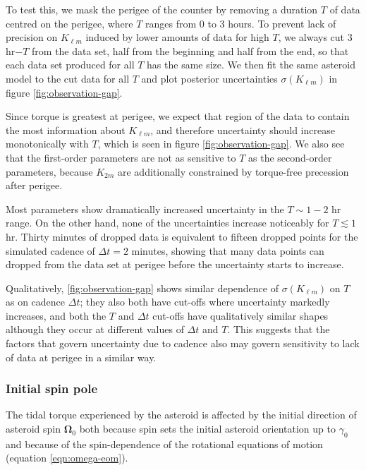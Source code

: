 \documentclass[fleqn,usenatbib]{mnras}
\begin{document}
To test this, we mask the perigee of the counter by removing a duration $T$ of data centred on the perigee, where $T$ ranges from 0 to 3 hours. To prevent lack of precision on $K_{\ell m}$ induced by lower amounts of data for high $T$, we always cut 3 hr$-T$ from the data set, half from the beginning and half from the end, so that each data set produced for all $T$ has the same size. We then fit the same asteroid model to the cut data for all $T$ and plot posterior uncertainties $\sigma(K_{\ell m})$ in figure \ref{fig:observation-gap}.

Since torque is greatest at perigee, we expect that region of the data to contain the most information about $K_{\ell m}$, and therefore uncertainty should increase monotonically with $T$, which is seen in figure \ref{fig:observation-gap}. We also see that the first-order parameters are not as sensitive to $T$ as the second-order parameters, because $K_{2m}$ are additionally constrained by torque-free precession after perigee.

Most parameters show dramatically increased uncertainty in the $T \sim 1-2$ hr range. On the other hand, none of the uncertainties increase noticeably for $T \lesssim 1$ hr. Thirty minutes of dropped data is equivalent to fifteen dropped points for the simulated cadence of $\Delta t = 2$ minutes, showing that many data points can dropped from the data set at perigee before the uncertainty starts to increase.

Qualitatively, \ref{fig:observation-gap} shows similar dependence of $\sigma(K_{\ell m})$ on $T$ as on cadence $\Delta t$; they also both have cut-offs where uncertainty markedly increases, and both the $T$ and $\Delta t$ cut-offs have qualitatively similar shapes although they occur at different values of $\Delta t$ and $T$. This suggests that the factors that govern uncertainty due to cadence also may govern sensitivity to lack of data at perigee in a similar way.


\subsubsection{Initial spin pole}
\label{sec:scan-spin}

The tidal torque experienced by the asteroid is affected by the initial direction of asteroid spin $\bm \Omega_0$ both because spin sets the initial asteroid orientation up to $\gamma_0$ and because of the spin-dependence of the rotational equations of motion (equation \ref{eqn:omega-eom}).
\end{document}

